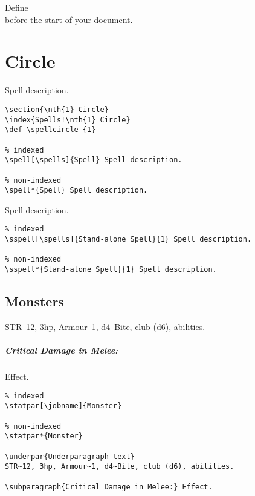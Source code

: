 \documentclass[itdr]{subfiles}
\begin{document}
\noindent Define \\before the start of your document.

\section{ Circle}
\def \spellcircle {1}

 Spell description.
\begin{lstlisting}
\section{\nth{1} Circle}
\index{Spells!\nth{1} Circle}
\def \spellcircle {1}

% indexed
\spell[\spells]{Spell} Spell description.

% non-indexed
\spell*{Spell} Spell description.
\end{lstlisting}

 Spell description.
\begin{lstlisting}
% indexed
\sspell[\spells]{Stand-alone Spell}{1} Spell description.

% non-indexed
\sspell*{Stand-alone Spell}{1} Spell description.
\end{lstlisting}

\vfill

\subsection{Monsters}

STR~12, 3hp, Armour~1, d4~Bite, club (d6), abilities.

\subparagraph{Critical Damage in Melee:} Effect.

\begin{lstlisting}
% indexed
\statpar[\jobname]{Monster}

% non-indexed
\statpar*{Monster}

\underpar{Underparagraph text}
STR~12, 3hp, Armour~1, d4~Bite, club (d6), abilities.

\subparagraph{Critical Damage in Melee:} Effect.
\end{lstlisting}
\vspace{-\baselineskip}
\break
\end{document}
